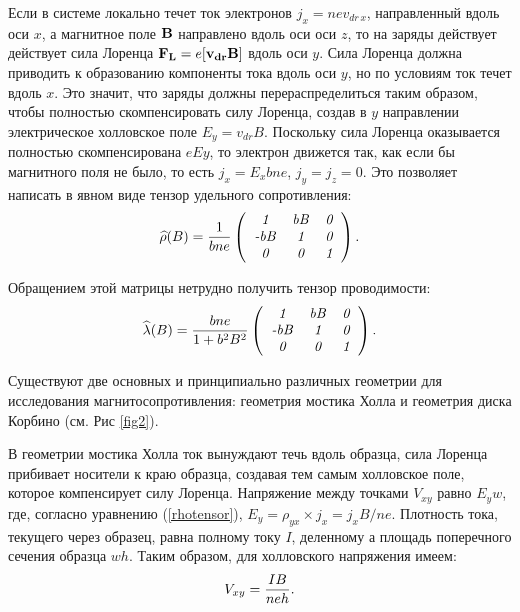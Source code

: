 Если в системе локально течет ток электронов $j_x=nev_{dr\, x}$, направленный вдоль оси $x$, а магнитное поле ${\bf B}$ направлено вдоль оси оси $z$, то на заряды действует действует сила Лоренца ${\bf F_{L}}=e[{\bf v_{dr}B]}$ вдоль оси $y$.
Сила Лоренца должна приводить к образованию компоненты тока вдоль оси $y$, но по условиям ток течет вдоль $x$. Это значит, что заряды должны перераспределиться таким образом, чтобы полностью скомпенсировать силу
Лоренца, создав в $y$ направлении электрическое холловское поле $E_y=v_{dr}B$. Поскольку сила Лоренца
оказывается полностью скомпенсирована $eEy$, то электрон движется так, как если бы магнитного поля не
было, то есть $j_x=E_xbne$, $j_y=j_z=0$. Это позволяет написать в явном виде тензор удельного сопротивления:
\begin{equation}
\widehat{\rho}(B)=\frac{1}{bne}\left(
\begin{tabular}{ccc}
{\it 1} & {\it bB} & {\it 0} \\
{\it -bB} &{\it 1}& {\it 0} \\
{\it 0} &{\it 0}& {\it 1}\\
\end{tabular}
\right).
	\eqmark{rhotensor}
\end{equation}

Обращением этой матрицы нетрудно получить тензор проводимости:
\begin{equation}
\widehat{\lambda}(B)=\frac{bne}{1+b^2B^2}\left(
\begin{tabular}{ccc}
{\it 1} & {\it bB} & {\it 0} \\
{\it -bB} &{\it 1}& {\it 0} \\
{\it 0} &{\it 0}& {\it 1}\\
\end{tabular}
\right).
	\eqmark{lambdatensor}
\end{equation}

Существуют две основных и принципиально различных геометрии для исследования магнитосопротивления: геометрия
мостика Холла и геометрия диска Корбино (см. Рис \ref{fig2}).

В геометрии мостика Холла ток вынуждают течь вдоль образца, сила Лоренца прибивает носители к краю образца, создавая тем самым холловское поле, которое компенсирует силу Лоренца. Напряжение между точками $V_{xy}$ равно $E_yw$, где, согласно уравнению (\eqref{rhotensor}), $E_y=\rho_{yx}\times j_x=j_x B/ne$. Плотность тока, текущего через образец, равна полному току $I$, деленному а площадь поперечного сечения образца $wh$. Таким образом, для холловского напряжения имеем:
\begin{equation}
	V_{xy}=\frac{IB}{neh}.
	\eqmark{HallVoltage}
\end{equation}


